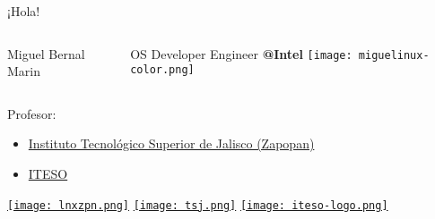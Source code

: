 
\begin{frame}[c]{¡Hola!}

  \begin{columns}
      Miguel Bernal Marin

      \vspace{\baselineskip}
      OS Developer Engineer \textbf{@Intel}
      \texttt{[image: miguelinux-color.png]}
  \end{columns}

  Profesor:
  \begin{itemize}
    \item \href{https://tsj.mx/}{Instituto Tecnológico Superior
      de Jalisco (Zapopan)}
    \item \href{https://iteso.mx/}{ITESO}
  \end{itemize}

  \vspace{\baselineskip}
    \href{https://t.me/linuxeroszapopan}{\texttt{[image: lnxzpn.png]}}
    \hspace{1cm}
    \href{https://tecmm.edu.mx/}{\texttt{[image: tsj.png]}}
    \hspace{1cm}
    \href{https://iteso.mx/}{\texttt{[image: iteso-logo.png]}}
\end{frame}
